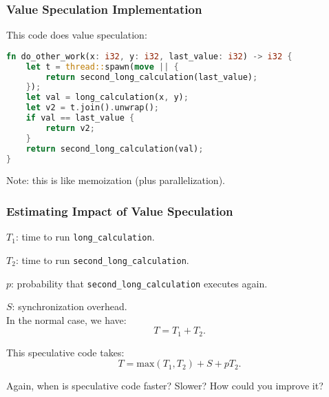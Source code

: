 \begin{frame}[fragile]
  \frametitle{Value Speculation Implementation}
  
  This code does value speculation:

\begin{lstlisting}[language=Rust]
fn do_other_work(x: i32, y: i32, last_value: i32) -> i32 {
    let t = thread::spawn(move || {
        return second_long_calculation(last_value);
    });
    let val = long_calculation(x, y);
    let v2 = t.join().unwrap();
    if val == last_value {
        return v2;
    }
    return second_long_calculation(val);
}
\end{lstlisting}


  Note: this is like memoization (plus parallelization).
  
\end{frame}

\begin{frame}
  \frametitle{Estimating Impact of Value Speculation}

  
  $T_1$: time to run {\tt long\_calculation}.

  $T_2$: time to run {\tt second\_long\_calculation}.

  $p$: probability that {\tt second\_long\_calculation} executes again.

  $S$: synchronization overhead.\\[1em]

  In the normal case, we have:
    \[ T = T_1 +T_2.\]

  This speculative code takes:
    \[ T = \mbox{max}(T_1, T_2) + S + pT_2.\]

     Again, when is speculative code faster? Slower? How could you improve it?

  
\end{frame}

